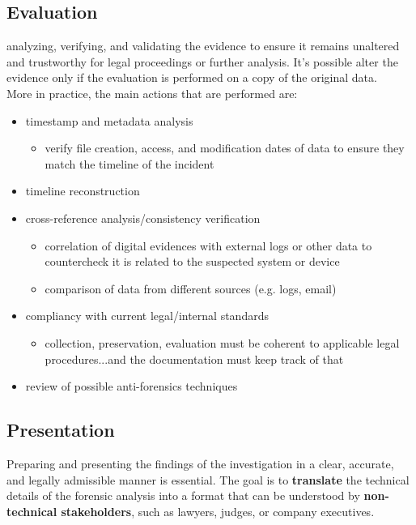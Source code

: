 \subsection{Evaluation}
analyzing, verifying, and validating the evidence to ensure it remains unaltered and trustworthy for legal proceedings or further analysis. It's possible alter the evidence only if the evaluation is performed on a copy of the original data. \\
More in practice, the main actions that are performed are:
\begin{itemize}[itemsep=0pt]
    \item timestamp and metadata analysis
    \begin{itemize}
        \item verify file creation, access, and modification dates of data to ensure they match the timeline of the incident
    \end{itemize}
    \item timeline reconstruction
    \item cross-reference analysis/consistency verification
    \begin{itemize}
        \item correlation of digital evidences with external logs or other data to countercheck it is related to the suspected system or device
    \item comparison of data from different sources (e.g. logs, email)
    \end{itemize}
    \item compliancy with current legal/internal standards
    \begin{itemize}
        \item collection, preservation, evaluation must be coherent to applicable legal procedures...and the documentation must keep track of that
    \end{itemize}
    \item review of possible anti-forensics techniques
\end{itemize}

\subsection{Presentation}
Preparing and presenting the findings of the investigation in a clear, accurate, and legally admissible manner is essential. The goal is to \textbf{translate} the technical details of the forensic analysis into a format that can be understood by \textbf{non-technical stakeholders}, such as lawyers, judges, or company executives.

